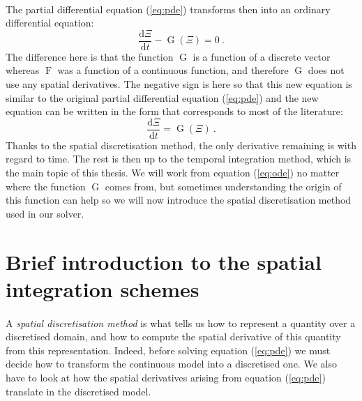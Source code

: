     \paragraph{}
    The partial differential equation (\ref{eq:pde}) transforms then into an ordinary differential equation:
    \begin{equation}
      \frac{\mathrm{d} \Xi}{\mathrm{d} t} - \operatorname{G}\left(\Xi\right) = 0 \ .
    \end{equation}
    The difference here is that the function $\operatorname{G}$ is a function of a discrete vector whereas $\operatorname{F}$ was a function of a continuous function, and therefore $\operatorname{G}$ does not use any spatial derivatives.
    The negative sign is here so that this new equation is similar to the original partial differential equation (\ref{eq:pde}) and the new equation can be written in the form that corresponds to most of the literature:
    \begin{equation}\label{eq:ode}
      \frac{\mathrm{d} \Xi}{\mathrm{d} t} = \operatorname{G}\left(\Xi\right) \ .
    \end{equation}
    Thanks to the spatial discretisation method, the only derivative remaining is with regard to time.
    The rest is then up to the temporal integration method, which is the main topic of this thesis.
    We will work from equation (\ref{eq:ode}) no matter where the function $\operatorname{G}$ comes from, but sometimes understanding the origin of this function can help so we will now introduce the spatial discretisation method used in our solver.


  \section{Brief introduction to the spatial integration schemes}

    \paragraph{}
    A \emph{spatial discretisation method} is what tells us how to represent a quantity over a discretised domain, and how to compute the spatial derivative of this quantity from this representation.
    Indeed, before solving equation (\ref{eq:pde}) we must decide how to transform the continuous model into a discretised one.
    We also have to look at how the spatial derivatives arising from equation (\ref{eq:pde}) translate in the discretised model.

